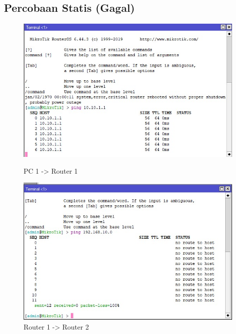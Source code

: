 \subsection*{Percobaan Statis (Gagal)}
\begin{figure}[H]
  \centering
  \begin{minipage}[t]{0.48\textwidth}
    \centering
    \includegraphics[width=\linewidth]{P1/img/PC1->Router1.jpeg}
    \caption{PC 1 -> Router 1}
    \label{fig:pc1router1}
  \end{minipage}
  \hfill
  \begin{minipage}[t]{0.48\textwidth}
    \centering
    \includegraphics[width=\linewidth]{P1/img/Router1->Router2.jpeg}
    \caption{Router 1 -> Router 2}
    \label{fig:router1router2}
  \end{minipage}
\end{figure}

